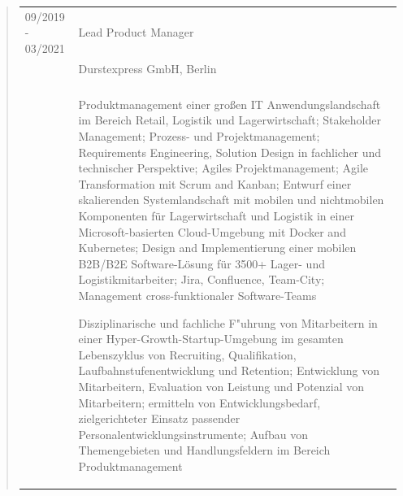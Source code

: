	\begin{quote}
		\begin{tabular}{p{4cm}l}
			09/2019 - 03/2021&Lead Product Manager\\
			&Durstexpress GmbH, Berlin\\
			\\
			&\begin{minipage}{10cm}
				Produktmanagement einer großen IT Anwendungslandschaft im Bereich Retail, 
				Logistik und Lagerwirtschaft; Stakeholder Management; Prozess- und Projektmanagement; 
				Requirements Engineering, Solution Design in fachlicher und technischer Perspektive; 
				Agiles Projektmanagement; Agile Transformation mit Scrum and Kanban; Entwurf einer 
				skalierenden Systemlandschaft mit mobilen und nichtmobilen Komponenten für 
				Lagerwirtschaft und Logistik in einer Microsoft-basierten Cloud-Umgebung mit Docker 
				and Kubernetes; Design and Implementierung einer mobilen B2B/B2E Software-Lösung für 
				3500+ Lager- und Logistikmitarbeiter; Jira, Confluence, Team-City; Management 
				cross-funktionaler Software-Teams\newline
						
				Disziplinarische und fachliche F"uhrung von Mitarbeitern in einer 
				Hyper-Growth-Startup-Umgebung im gesamten Lebenszyklus von Recruiting, Qualifikation, 
				Laufbahnstufenentwicklung und Retention; Entwicklung von Mitarbeitern, Evaluation von 
				Leistung und Potenzial von Mitarbeitern; ermitteln von  Entwicklungsbedarf, 
				zielgerichteter Einsatz passender Personalentwicklungsinstrumente; Aufbau von 
				Themengebieten und Handlungsfeldern im Bereich Produktmanagement
			\end{minipage}
		\end{tabular}
	\end{quote}
